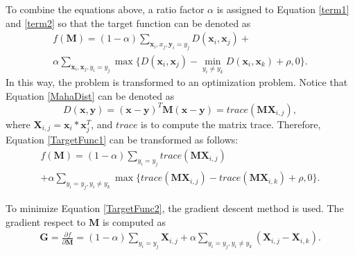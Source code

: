  
 To combine the equations above, a ratio factor $\alpha$ is assigned to Equation \eqref{term1} and \eqref{term2} so that the target function can be denoted as 
  \begin{equation}
  \label{TargetFunc1}
  \begin{aligned}
 f(\bm{M}) = (1-\alpha)\sum_{\bm{x}_i,x_j,\bm{y}_i=y_j} D(\bm{x}_i,\bm{x}_j) + \\
  \alpha \sum_{\bm{x}_i,\bm{x}_j,y_i=y_j}\max\{{D(\bm{x}_i,\bm{x}_j)-\min_{y_i\ne y_k}{D(\bm{x}_i,\bm{x}_k)}+\rho,0}\}.
 \end{aligned}
 \end{equation}
 In this way, the problem is transformed to an optimization problem. Notice that Equation \ref{MahaDist} can be denoted as 
 \begin{equation}
 D(\bm{x},\bm{y}) = (\bm{x} - \bm{y})^T\bm{M}(\bm{x} - \bm{y}) = trace(\bm{M}\bm{X}_{i,j}),
 \end{equation}
 where $\bm{X}_{i,j} = \bm{x}_i*\bm{x}_j^T$, and $trace$ is to compute the matrix trace. Therefore, Equation \ref{TargetFunc1} can be transformed as follows:
 \begin{equation}
 \label{TargetFunc2}
 \begin{aligned}
 f(\bm{M}) = (1-\alpha)\sum_{y_i = y_j}trace(\bm{M}\bm{X}_{i,j}) \\
  + \alpha \sum_{y_i = y_j,y_i\ne y_k}\max\{trace(\bm{M}\bm{X}_{i,j}) - trace(\bm{M}\bm{X}_{i,k} )+ \rho,0\}.
 \end{aligned}
 \end{equation}
 
 To minimize Equation \ref{TargetFunc2}, the gradient descent method is used. The gradient respect to $\bm{M}$ is computed as
 \begin{equation}
 \begin{aligned}
\bm{G} =  \frac{\partial f}{\partial \bm{M}} = (1-\alpha) \sum_{y_i = y_j} \bm{X}_{i,j} 
 + \alpha \sum_{y_i = y_j, y_i \ne y_k}(\bm{X}_{i,j} - \bm{X}_{i,k}).
 \end{aligned}
 \end{equation}
 
